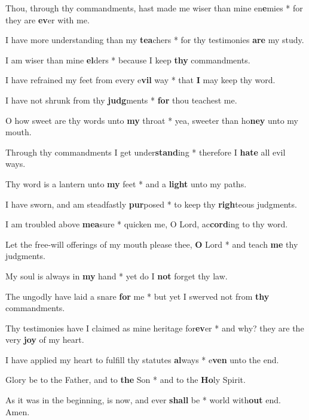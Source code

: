 \begin{multicols}{2}
	Thou, through thy commandments, hast made me wiser than mine en\textbf{e}mies * for they are \textbf{ev}er with me.
	
	I have more understanding than my \textbf{tea}chers * for thy testimonies \textbf{are} my study.
	
	I am wiser than mine \textbf{el}ders * because I keep \textbf{thy} commandments.
	
	I have refrained my feet from every e\textbf{vil} way * that \textbf{I} may keep thy word.
	
	I have not shrunk from thy \textbf{judg}ments * \textbf{for} thou teachest me.
	
	O how sweet are thy words unto \textbf{my} throat * yea, sweeter than ho\textbf{ney} unto my mouth.
	
	Through thy commandments I get under\textbf{stand}ing * therefore I \textbf{hate} all evil ways.
	
	Thy word is a lantern unto \textbf{my} feet * and a \textbf{light} unto my paths.
	
	I have sworn, and am steadfastly \textbf{pur}posed * to keep thy \textbf{righ}teous judgments.
	
	I am troubled above \textbf{mea}sure * quicken me, O Lord, ac\textbf{cord}ing to thy word.
	
	Let the free-will offerings of my mouth please thee, \textbf{O} Lord * and teach \textbf{me} thy judgments.
	
	My soul is always in \textbf{my} hand * yet do I \textbf{not} forget thy law.
	
	The ungodly have laid a snare \textbf{for} me * but yet I swerved not from \textbf{thy} commandments.
	
	Thy testimonies have I claimed as mine heritage for\textbf{ev}er * and why? they are the very \textbf{joy} of my heart.
	
	I have applied my heart to fulfill thy statutes \textbf{al}ways * e\textbf{ven} unto the end.
	
	Glory be to the Father, and to \textbf{the} Son * and to the \textbf{Ho}ly Spirit.
	
	As it was in the beginning, is now, and ever \textbf{shall} be * world with\textbf{out} end. Amen.
\end{multicols}